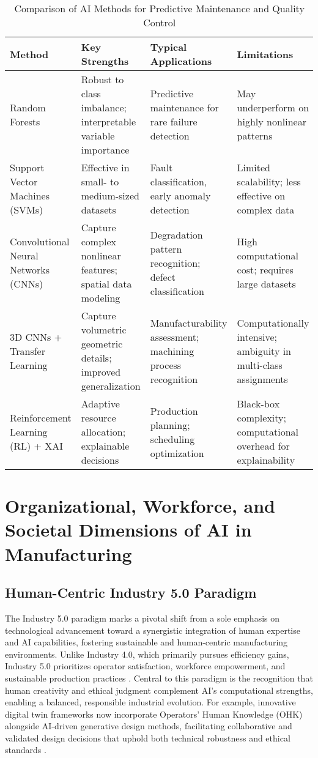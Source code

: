 \documentclass[sigconf]{acmart}
\begin{document}
\begin{table*}[htbp]
\centering
\caption{Comparison of AI Methods for Predictive Maintenance and Quality Control}
\label{tab:method_comparison}
\begin{adjustbox}{max width=\textwidth}
\begin{tabular}{llll}
\toprule
\textbf{Method} & \textbf{Key Strengths} & \textbf{Typical Applications} & \textbf{Limitations} \\
\toprule
Random Forests & Robust to class imbalance; interpretable variable importance & Predictive maintenance for rare failure detection & May underperform on highly nonlinear patterns \\
Support Vector Machines (SVMs) & Effective in small- to medium-sized datasets & Fault classification, early anomaly detection & Limited scalability; less effective on complex data \\
Convolutional Neural Networks (CNNs) & Capture complex nonlinear features; spatial data modeling & Degradation pattern recognition; defect classification & High computational cost; requires large datasets \\
3D CNNs + Transfer Learning & Capture volumetric geometric details; improved generalization & Manufacturability assessment; machining process recognition & Computationally intensive; ambiguity in multi-class assignments \\
Reinforcement Learning (RL) + XAI & Adaptive resource allocation; explainable decisions & Production planning; scheduling optimization & Black-box complexity; computational overhead for explainability \\
\bottomrule
\end{tabular}
\end{adjustbox}
\end{table*}

\section{Organizational, Workforce, and Societal Dimensions of AI in Manufacturing}

\subsection{Human-Centric Industry 5.0 Paradigm}

The Industry 5.0 paradigm marks a pivotal shift from a sole emphasis on technological advancement toward a synergistic integration of human expertise and AI capabilities, fostering sustainable and human-centric manufacturing environments. Unlike Industry 4.0, which primarily pursues efficiency gains, Industry 5.0 prioritizes operator satisfaction, workforce empowerment, and sustainable production practices \cite{ref2}. Central to this paradigm is the recognition that human creativity and ethical judgment complement AI’s computational strengths, enabling a balanced, responsible industrial evolution. For example, innovative digital twin frameworks now incorporate Operators’ Human Knowledge (OHK) alongside AI-driven generative design methods, facilitating collaborative and validated design decisions that uphold both technical robustness and ethical standards \cite{ref14}.
\end{document}
